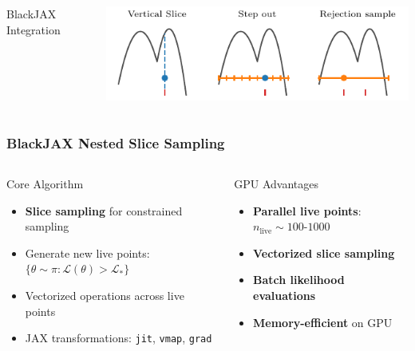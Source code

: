 \documentclass[aspectratio=169]{beamer}
\begin{document}
\begin{frame}
\begin{columns}
\begin{block}{BlackJAX Integration}
\begin{itemize}
            \end{itemize}
        \end{block}
        \vspace{10pt}
        \includegraphics[width=\textwidth]{figures/slice_sampling_diagram}
    \end{columns}
\end{frame}

\begin{frame}
    \frametitle{BlackJAX Nested Slice Sampling}
    \begin{columns}
        \begin{block}{Core Algorithm}
            \begin{itemize}
                \item \textbf{Slice sampling} for constrained sampling
                \item Generate new live points: $\{\theta \sim \pi : \mathcal{L}(\theta) > \mathcal{L}_*\}$
                \item Vectorized operations across live points
                \item JAX transformations: \texttt{jit}, \texttt{vmap}, \texttt{grad}
            \end{itemize}
        \end{block}
        \begin{block}{GPU Advantages}
            \begin{itemize}
                \item \textbf{Parallel live points}: $n_{\text{live}} \sim 100\text{-}1000$
                \item \textbf{Vectorized slice sampling}
                \item \textbf{Batch likelihood evaluations}
                \item \textbf{Memory-efficient} on GPU
            \end{itemize}
        \end{block}

\end{columns}
\end{frame}
\end{document}
